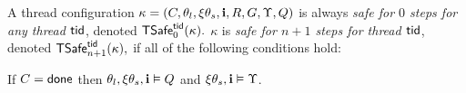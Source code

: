 \begin{defin}\label{def:safe}
  A thread configuration  
  $\kappa = (C,\theta_l,\xi\theta_s,{\bf i},R,G,\Upsilon, Q)$ is always \emph{safe
  for $0$ steps for \emph{any} thread ${\sf tid}$}, denoted 
  $
  {\sf TSafe}^{{\sf tid}}_0(\kappa).
  $
  $\kappa$ is \emph{safe for $n + 1$ steps for thread ${\sf tid}$},  
  denoted 
  $
  {\sf TSafe}^{{\sf tid}}_{n+1}(\kappa),
  $
  if all of the following conditions hold:
  \begin{compactenum}[(a)]
    \item \label{safe:done} If 
    $C = {\sf done}$ then $\theta_l,\xi\theta_s,{\bf i} \vDash Q$ and $\xi\theta_s,{\bf i}\vDash\Upsilon$.


\end{compactenum}
\end{defin}
